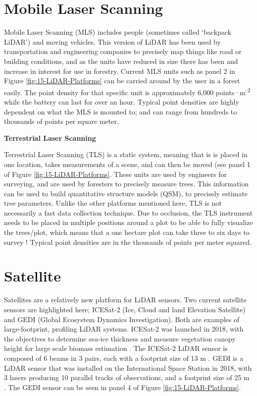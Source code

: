 \documentclass[
]{book}
\begin{document}
\hypertarget{mobile-laser-scanning}{%
\section{Mobile Laser Scanning}\label{mobile-laser-scanning}}

Mobile Laser Scanning (MLS) includes people (sometimes called `backpack LiDAR') and moving vehicles. This version of LiDAR has been used by transportation and engineering companies to precisely map things like road or building conditions, and as the units have reduced in size there has been and increase in interest for use in forestry. Current MLS units such as panel 2 in Figure \ref{fig:15-LiDAR-Platforms} can be carried around by the user in a forest easily. The point density for that specific unit is approximately 6,000 points·m\textsuperscript{-2} while the battery can last for over an hour. Typical point densities are highly dependent on what the MLS is mounted to; and can range from hundreds to thousands of points per square meter.

\textbf{Terrestrial Laser Scanning}

Terrestrial Laser Scanning (TLS) is a static system, meaning that is is placed in one location, takes measurements of a scene, and can then be moved (see panel 1 of Figure \ref{fig:15-LiDAR-Platforms}. These units are used by engineers for surveying, and are used by foresters to precisely measure trees. This information can be used to build quantitative structure models (QSM), to precisely estimate tree parameters. Unlike the other platforms mentioned here, TLS is not necessarily a fast data collection technique. Due to occlusion, the TLS instrument needs to be placed in multiple positions around a plot to be able to fully visualize the trees/plot, which means that a one hectare plot can take three to six days to survey \citep{Wilkes2015}! Typical point densities are in the thousands of points per meter squared.

\hypertarget{satellite}{%
\section{Satellite}\label{satellite}}

Satellites are a relatively new platform for LiDAR sensors. Two current satellite sensors are highlighted here; ICESat-2 (Ice, Cloud and land Elevation Satellite) and GEDI (Global Ecosystem Dynamics Investigation). Both are examples of large-footprint, profiling LiDAR systems. ICESat-2 was launched in 2018, with the objectives to determine sea-ice thickness and measure vegetation canopy height for large scale biomass estimation \citep{NASA2021a}. The ICESat-2 LiDAR sensor is composed of 6 beams in 3 pairs, each with a footprint size of 13 m \citep{NASA2021a}. GEDI is a LiDAR sensor that was installed on the International Space Station in 2018, with 3 lasers producing 10 parallel tracks of observations, and a footprint size of 25 m \citep{NASA2021}. The GEDI sensor can be seen in panel 4 of Figure \ref{fig:15-LiDAR-Platforms}.
\end{document}
